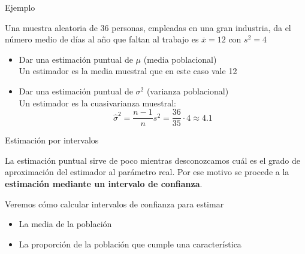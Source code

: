 \documentclass[11pt,handout]{beamer}
\begin{document}
\begin{frame}{Ejemplo}
\begin{block}{}
Una muestra aleatoria de 36 personas, empleadas en una gran industria, da el número medio de días al año que faltan al trabajo es $\overline{x} = 12$ con $s^2 = 4$
\end{block}

\begin{itemize}[<+->]
    \item Dar una estimación puntual de $\mu$ (media poblacional)
    \pause 
    \\ Un estimador es la media muestral que en este caso vale 12
    \item Dar una estimación puntual de $\sigma^2$ (varianza poblacional)
    \pause 
    \\ Un estimador es la cuasivarianza muestral:
    $$\widehat{\sigma}^2=\frac{n-1}{n}s^2=\frac{36}{35}\cdot 4\approx 4.1$$
\end{itemize}

\end{frame}


\begin{frame}{Estimación por intervalos}
\begin{block}{}
La estimación puntual sirve de poco mientras
desconozcamos cuál es el grado de aproximación del estimador al parámetro real. Por ese motivo se procede
a la \textbf{estimación mediante un intervalo de confianza}.
\end{block}
\pause
Veremos cómo calcular intervalos de confianza para estimar
\begin{itemize}
    \item La media de la población
    \item La proporción de la población que cumple una característica
\end{itemize}
\end{frame}
\end{document}
